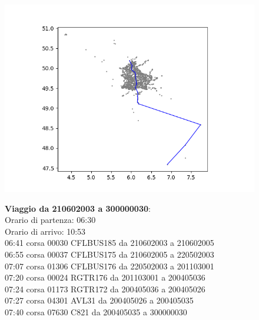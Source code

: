\documentclass{article}
\begin{document}
\begin{figure}[H]
	\begin{minipage}{0.55\linewidth}
		\centering
		\hspace*{-3cm}\includegraphics[width=1.0\linewidth, valign=t]{figures/Figure_1}
	\end{minipage}
	\hspace*{-2cm}\begin{minipage}{0.7\linewidth}
		\textbf{Viaggio da 210602003 a 300000030}:\\
		Orario di partenza: 06:30\\
		Orario di arrivo: 10:53\\
		06:41 corsa 00030 CFLBUS185 da 210602003 a 210602005\\
		06:55 corsa 00037 CFLBUS175 da 210602005 a 220502003\\
		07:07 corsa 01306 CFLBUS176 da 220502003 a 201103001\\
		07:20 corsa 00024 RGTR176 da 201103001 a 200405036\\
		07:24 corsa 01173 RGTR172 da 200405036 a 200405026\\
		07:27 corsa 04301 AVL31 da 200405026 a 200405035\\
		07:40 corsa 07630 C821 da 200405035 a 300000030
			\end{minipage}
\end{figure}
\end{document}
